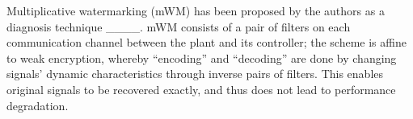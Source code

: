 Multiplicative watermarking (mWM) has been proposed by the authors as a diagnosis technique ____. mWM consists of a pair of filters on each communication channel between the plant and its controller; the scheme is affine to weak encryption, whereby ``encoding'' and ``decoding'' are done by changing signals' dynamic characteristics through inverse pairs of filters. This enables original signals to be recovered exactly, and thus does not lead to performance degradation.

%